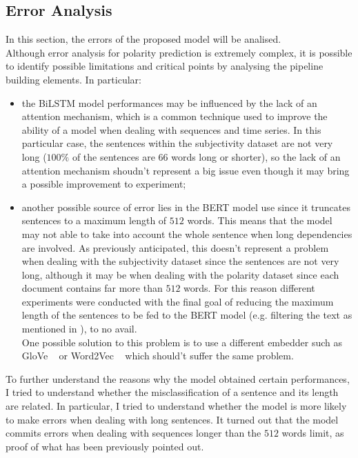 \subsection{Error Analysis}
\label{subsec:err}
In this section, the errors of the proposed model will be analised.\\
Although error analysis for polarity prediction is extremely complex, it is possible to identify possible limitations and critical points by analysing the pipeline building 
elements. In particular:
\begin{itemize}

    \item the BiLSTM model performances may be influenced by the lack of an attention mechanism, which is a common technique used to improve the ability of a model when 
        dealing with sequences and time series. In this particular case, the sentences within the subjectivity dataset are not very long ($100\%$ of the sentences are 
        $66$ words long or shorter), so the lack of an attention mechanism shoudn't represent a big issue even though it may bring a possible improvement to experiment;

    \item another possible source of error lies in the BERT model use since it truncates sentences to a maximum length of $512$ words.
        This means that the model may not able to take into account the whole sentence when long dependencies are involved. 
        As previously anticipated, this doesn't represent a problem when dealing with the subjectivity dataset since the sentences are not very long, 
        although it may be when dealing with the polarity dataset since each document contains far more than $512$ words.
        For this reason different experiments were conducted with the final goal of reducing the maximum length of the sentences to be fed to the BERT model
        (e.g. filtering the text as mentioned in ), to no avail. \\
        One possible solution to this problem is to use a different embedder such as GloVe ~\cite{glove} or Word2Vec ~\cite{word2vec} which should't suffer the same problem.

\end{itemize}

To further understand the reasons why the model obtained certain performances, I tried to understand whether the misclassification of a sentence and its length are related. 
In particular, I tried to understand whether the model is more likely to make errors when dealing with long sentences. It turned out that the model
commits errors when dealing with sequences longer than the $512$ words limit, as proof of what has been previously pointed out.\\

